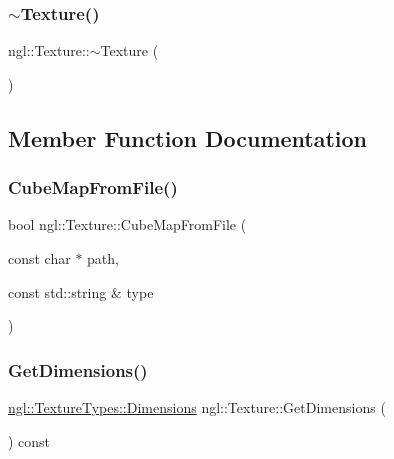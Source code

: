 \mbox{\label{classngl_1_1_texture_a30a5a45fdd980b78fcee13cb05283d2c}} 
\subsubsection{\texorpdfstring{$\sim$\+Texture()}{~Texture()}}
{\footnotesize\ttfamily ngl\+::\+Texture\+::$\sim$\+Texture (\begin{DoxyParamCaption}{ }\end{DoxyParamCaption})}



\subsection{Member Function Documentation}
\mbox{\label{classngl_1_1_texture_a47e0be95615fdb9daeddced549ce5a73}} 
\subsubsection{\texorpdfstring{Cube\+Map\+From\+File()}{CubeMapFromFile()}}
{\footnotesize\ttfamily bool ngl\+::\+Texture\+::\+Cube\+Map\+From\+File (\begin{DoxyParamCaption}\item[{const char $\ast$}]{path,  }\item[{const std\+::string \&}]{type }\end{DoxyParamCaption})}

\mbox{\label{classngl_1_1_texture_a90fdf8aabbf28403ddcb190bca03e585}} 
\subsubsection{\texorpdfstring{Get\+Dimensions()}{GetDimensions()}}
{\footnotesize\ttfamily \mbox{\hyperlink{structngl_1_1_texture_types_a83a45c404d98265ef92b45a6a86c479b}{ngl\+::\+Texture\+Types\+::\+Dimensions}} ngl\+::\+Texture\+::\+Get\+Dimensions (\begin{DoxyParamCaption}{ }\end{DoxyParamCaption}) const}

